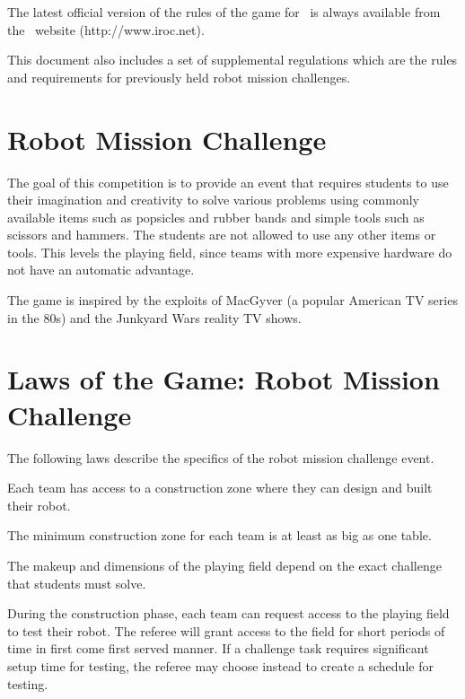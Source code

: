 \documentclass[12pt]{hurocup}
\begin{document}
The latest official version of the rules of the game for \IROC\ is
always available from the \IROC\ website (http://www.iroc.net).

This document also includes a set of supplemental regulations which
are the rules and requirements for previously held robot mission
challenges.

\section{Robot Mission Challenge}
\label{sec:robot-mission-challenge} 

The goal of this competition is to provide an event that requires
students to use their imagination and creativity to solve various
problems using commonly available items such as popsicles and rubber
bands and simple tools such as scissors and hammers. The students are
not allowed to use any other items or tools. This levels the playing
field, since teams with more expensive hardware do not have an
automatic advantage.

The game is inspired by the exploits of MacGyver (a popular American TV
series in the 80s) and the Junkyard Wars reality TV shows.

\section{Laws of the Game: Robot Mission Challenge}
\label{sec:laws-robot-mission-challenge}

The following laws describe the specifics of the robot mission
challenge event.

\label{jc-team}

\begin{lawlist}[JC]

\item Each team has access to a construction zone where they can
  design and built their robot. 

\item The minimum construction zone for each team is at least as big
  as one table.

\end{lawlist}

\label{lc-field}

\begin{lawlist}[JC]

\item The makeup and dimensions of the playing field depend on the
  exact challenge that students must solve.

\item During the construction phase, each team can request access to
  the playing field to test their robot. The referee will grant access
  to the field for short periods of time in first come first served
  manner. If a challenge task requires significant setup time for
  testing, the referee may choose instead to create a schedule for
  testing.

\end{lawlist}
\end{document}
